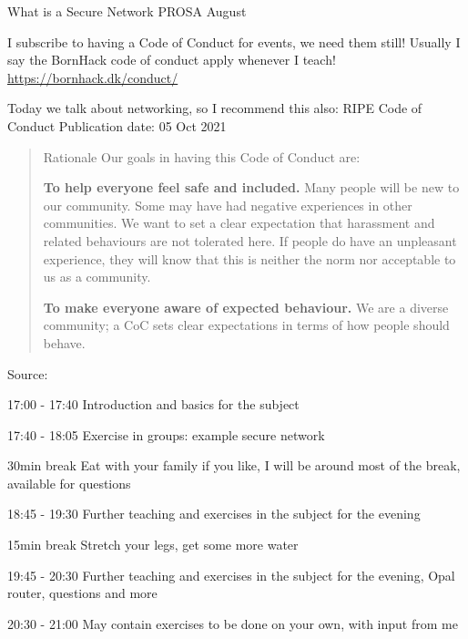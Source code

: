 \documentclass[Screen16to9,17pt]{foils}
\begin{document}
\mytitlepage
{What is a Secure Network}
{PROSA August \the\year{}}


\hlkprofiluk



I subscribe to having a Code of Conduct for events, we need them still! Usually I say the BornHack code of conduct apply whenever I teach! \url{https://bornhack.dk/conduct/}

Today we talk about networking, so I recommend this also:
RIPE Code of Conduct
Publication date: 05 Oct 2021

\begin{quote}
Rationale
Our goals in having this Code of Conduct are:
\begin{list2}
\item {\bf To help everyone feel safe and included.} Many people will be new to our community. Some may have had negative experiences in other communities. We want to set a clear expectation that harassment and related behaviours are not tolerated here. If people do have an unpleasant experience, they will know that this is neither the norm nor acceptable to us as a community.

\item {\bf To make everyone aware of expected behaviour.} We are a diverse community; a CoC sets clear expectations in terms of how people should behave.
\end{list2}
\end{quote}
Source: {\small
{}}


\begin{list2}
\item 17:00 - 17:40 Introduction and basics for the subject

\item 17:40 - 18:05 Exercise in groups: example secure network

\item 30min break Eat with your family if you like, I will be around most of the break, available for questions

\item 18:45 - 19:30 Further teaching and exercises in the subject for the evening

\item 15min break Stretch your legs, get some more water

\item 19:45 - 20:30
Further teaching and exercises in the subject for the evening, Opal router, questions and more

\item 20:30 - 21:00 May contain exercises to be done on your own, with input from me
\end{list2}
\end{document}
